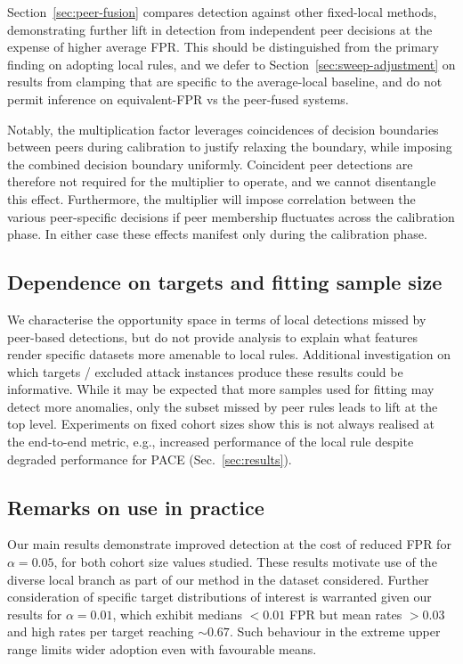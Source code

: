 Section~\ref{sec:peer-fusion} compares detection against other fixed-local methods, demonstrating further lift in detection from independent peer decisions at the expense of higher average FPR. This should be distinguished from the primary finding on adopting local rules, and we defer to Section~\ref{sec:sweep-adjustment} on results from clamping that are specific to the average-local baseline, and do not permit inference on equivalent-FPR vs the peer-fused systems.

Notably, the multiplication factor leverages coincidences of decision boundaries between peers during calibration to justify relaxing the boundary, while imposing the combined decision boundary uniformly. Coincident peer detections are therefore not required for the multiplier to operate, and we cannot disentangle this effect. Furthermore, the multiplier will impose correlation between the various peer-specific decisions if peer membership fluctuates across the calibration phase. In either case these effects manifest only during the calibration phase.

\subsection{Dependence on targets and fitting sample size}
We characterise the opportunity space in terms of local detections missed by peer-based detections, but do not provide analysis to explain what features render specific datasets more amenable to local rules. Additional investigation on which targets / excluded attack instances produce these results could be informative. While it may be expected that more samples used for fitting may detect more anomalies, only the subset missed by peer rules leads to lift at the top level. Experiments on fixed cohort sizes show this is not always realised at the end-to-end metric, e.g., increased performance of the local rule despite degraded performance for PACE (Sec.~\ref{sec:results}).

\subsection{Remarks on use in practice} 
Our main results demonstrate improved detection at the cost of reduced FPR for $\alpha=0.05$, for both cohort size values studied. These results motivate use of the diverse local branch as part of our method in the dataset considered. Further consideration of specific target distributions of interest is warranted given our results for $\alpha=0.01$, which exhibit medians $<0.01$ FPR but mean rates $>0.03$ and high rates per target reaching $\sim 0.67$. Such behaviour in the extreme upper range limits wider adoption even with favourable means.

